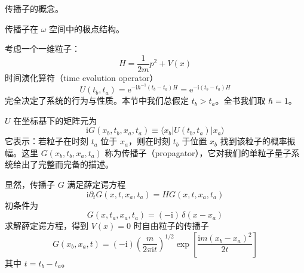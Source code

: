 \begin{keypoints}
\item 传播子的概念。
\item 传播子在 $\omega$ 空间中的极点结构。
\end{keypoints}

考虑一个一维粒子：
\begin{equation*}
H = \frac{1}{2m}p^2 + V(x) \tag{2.1.1}
\end{equation*}
时间演化算符（time evolution operator）
\begin{equation*}
U(t_b,t_a) = \mathrm{e}^{-\mathrm{i}\hbar^{-1}(t_b-t_a)H} = \mathrm{e}^{-\mathrm{i}(t_b-t_a)H}
\end{equation*}
完全决定了系统的行为与性质。本节中我们总假定 $t_b > t_a$。全书我们取 $\hbar = 1$。

$U$ 在坐标基下的矩阵元为
\begin{equation*}
\mathrm{i}G(x_b,t_b,x_a,t_a) \equiv \langle x_b|U(t_b,t_a)|x_a\rangle
\end{equation*}
它表示：若粒子在时刻 $t_a$ 位于 $x_a$，则在时刻 $t_b$ 于位置 $x_b$ 找到该粒子的概率振幅。这里 $G(x_b,t_b,x_a,t_a)$ 称为传播子（propagator），它对我们的单粒子量子系统给出了完整而完备的描述。

显然，传播子 $G$ 满足薛定谔方程
\begin{equation*}
\mathrm{i}\partial_t G(x,t,x_a,t_a) = H G(x,t,x_a,t_a)
\end{equation*}
初条件为
\begin{equation*}
G(x,t_a,x_a,t_a) = (-\mathrm{i})\,\delta(x-x_a)
\end{equation*}
求解薛定谔方程，得到 $V(x)=0$ 时自由粒子的传播子
\begin{equation*}
G(x_b,x_a,t) = (-\mathrm{i})\left(\frac{m}{2\pi\mathrm{i}t}\right)^{1/2} \exp\left[\frac{\mathrm{i}m(x_b-x_a)^2}{2t}\right] \tag{2.1.2}
\end{equation*}
其中 $t = t_b - t_a$。

